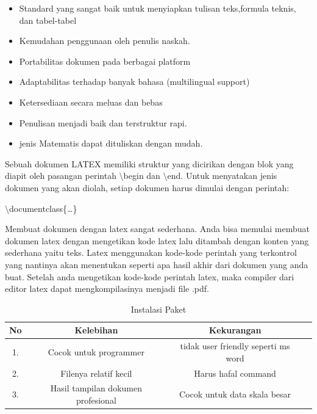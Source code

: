 \begin{itemize}
\item Standard yang sangat baik untuk menyiapkan tulisan teks,formula 
teknis, dan tabel-tabel
\item Kemudahan penggunaan oleh penulis naskah.
\item Portabilitas dokumen pada berbagai platform
\item Adaptabilitas terhadap banyak bahasa (multilingual support)
\item Ketersediaan secara meluas dan bebas
\item Penulisan menjadi baik dan terstruktur rapi.
\item jenis Matematis dapat dituliskan dengan mudah.
\end{itemize}
\hspace{0,5in}Sebuah dokumen LATEX memiliki struktur yang dicirikan dengan blok yang diapit oleh pasangan perintah $\setminus$begin dan $\setminus$end. 
Untuk menyatakan jenis dokumen yang akan diolah, setiap dokumen harus dimulai dengan perintah:\par \vspace{12pt} $\setminus$documentclass\{\ldots \}\par \vspace{12pt}


Membuat dokumen dengan latex sangat sederhana. Anda bisa memulai membuat dokumen latex dengan mengetikan kode latex lalu ditambah dengan konten yang sederhana yaitu teks. Latex menggunakan kode-kode perintah yang terkontrol yang nantinya akan menentukan seperti apa hasil akhir dari dokumen yang anda buat. Setelah anda mengetikan kode-kode perintah latex, maka compiler dari editor latex dapat mengkompilasinya menjadi file .pdf. \par \vspace{12pt} 


\begin{table}[ht]
	\caption{Instalasi Paket}
	\centering
	\begin{tabular}{cccc}
		\hline
		No&Kelebihan&Kekurangan&\\
		\hline
		1.&Cocok untuk programmer&tidak user friendly seperti ms word&\\
		2.&Filenya relatif kecil&Harus hafal command&\\
		3.&Hasil tampilan dokumen profesional& Cocok untuk data skala besar&\\
		\hline
	\end{tabular}
\end{table}

